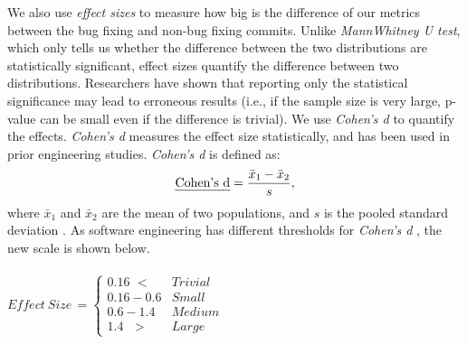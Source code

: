 \documentclass[conference]{IEEEtran}
\begin{document}
We also use {\em effect sizes} to measure how big is the difference of our metrics between the bug fixing and non-bug fixing commits. Unlike {\em MannWhitney U test}, which only tells us whether the difference between the two distributions are statistically significant, effect sizes quantify the difference between two distributions. Researchers have shown that reporting only the statistical significance may lead to erroneous results  (i.e., if the sample size is very large, p-value can be small even if the difference is trivial). We use {\em Cohen's d} to quantify the effects. {\em Cohen's d} measures the effect size statistically, and has been used in prior engineering studies. {\em Cohen's d} is defined as:
\begin{equation} \text{{\em Cohen's d}} = \frac{\bar{x}_1 - \bar{x}_2}{s},
\label{eq:cohensd}
\end{equation}
where $\bar{x}_1$ and $\bar{x}_2$ are the mean of two populations, and $s$ is the pooled standard deviation \cite{shadish2009combining}. As software engineering has different thresholds for 
{\em Cohen's d} \cite{Effectsize}, the new scale is shown below. \\ \\
$Effect\: Size\,=\begin{cases}
0.16\,\,< & Trivial\\
0.16-0.6 & Small\\
0.6-1.4 & Medium\\
1.4\;\,\,> & Large
\end{cases}$ 
\\
\end{document}
